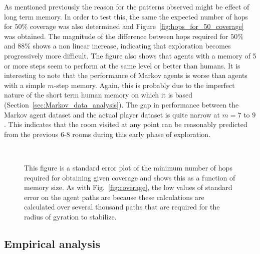 As mentioned previously the reason for the patterns observed might be effect of long term memory. In order to test this, the same the expected number of hops for $50\%$ coverage was also determined and Figure~\ref{fig:hops_for_50_coverage} was obtained. The magnitude of the difference between hops required for $50\%$ and $88\%$ shows a non linear increase, indicating that exploration becomes progressively more difficult. The figure also shows that agents with a memory of 5 or more steps seem to perform at the same level or better than humans. It is interesting to note that the performance of Markov agents is worse than agents with a simple $m$-step memory. Again, this is probably due to the imperfect nature of the short term human memory on which it is based (Section~\ref{sec:Markov_data_analysis}). The gap in performance between the Markov agent dataset and the actual player dataset is quite narrow at $m = 7$ to $9$. This indicates that the room visited at any point can be reasonably predicted from the previous 6-8 rooms during this early phase of exploration.


\begin{figure*}[tb]
    \centering
   \\

    \caption[Minimum expected number of hops for given coverage]{This figure is a standard error plot of the minimum number of hops required for obtaining given coverage and shows this as a function of memory size. As with Fig.~\ref{fig:coverage}, the low values of standard error on the agent paths are because these calculations are calculated over several thousand paths that are required for the radius of gyration to stabilize.}
\end{figure*}




\subsection{Empirical analysis} %
\label{sec:empiricalanalysis}

